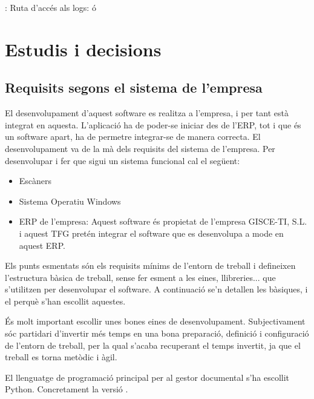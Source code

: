 \documentclass[letterpaper,11pt,catalan]{sphinxmanual}
\begin{document}
: Ruta d'accés als logs:  ó 


\chapter{Estudis i decisions}
\label{\detokenize{index:estudis-i-decisions}}

\section{Requisits segons el sistema de l'empresa}
\label{\detokenize{index:requisits-segons-el-sistema-de-l-empresa}}
El desenvolupament d'aquest software es realitza a l'empresa, i per tant
està integrat en aquesta. L'aplicació ha de poder-se iniciar des de l'ERP,
tot i que és un software apart, ha de permetre integrar-se de manera correcta.
El desenvolupament va de la mà dels requisits del sistema de l'empresa. Per desenvolupar i
fer que sigui un sistema funcional cal el següent:
\begin{itemize}
\item {} 
Escàners

\item {} 
Sistema Operatiu Windows

\item {} 
ERP de l'empresa:
Aquest software és propietat de l'empresa GISCE-TI, S.L. i aquest TFG pretén
integrar el software que es desenvolupa a mode  en aquest ERP.

\end{itemize}

Els punts esmentats són els requisits mínims de l'entorn de treball i defineixen
l'estructura bàsica de treball, sense fer esment a les eines, llibreries... que
s'utilitzen per desenvolupar el software. A continuació se'n detallen les bàsiques,
i el perquè s'han escollit aquestes.

És molt important escollir unes bones eines de desenvolupament. Subjectivament sóc
partidari d'invertir més temps en una bona preparació, definició i configuració de
l'entorn de treball, per la qual s'acaba recuperant el temps invertit, ja que el treball es torna metòdic i àgil.

El llenguatge de programació principal per al gestor documental s'ha escollit
Python. Concretament la versió .
\end{document}

